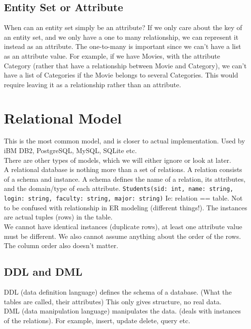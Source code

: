 \documentclass[12pt]{article}
\theoremstyle{definition}
\begin{document}
\subsection{Entity Set or Attribute}
When can an entity set simply be an attribute? If we only care about the key of an entity set, and we only have a one to many relationship, we can represent it instead as an attribute. The one-to-many is important since we can't have a list as an attribute value. For example, if we have Movies, with the attribute Category (rather that have a relationship between Movie and Category), we can't have a list of Categories if the Movie belongs to several Categories. This would require leaving it as a relationship rather than an attribute.
\\ \linebreak

\section{Relational Model}
This is the most common model, and is closer to actual implementation. Used by iBM DB2, PostgreSQL, MySQL, SQLite etc.
\\ \linebreak
There are other types of models, which we will either ignore or look at later. 
\\ \linebreak
A relational database is nothing more than a set of relations. A relation consists of a schema and instance. A schema defines the name of a relation, its attributes, and the domain/type of each attribute. \texttt{Students(sid: int, name: string, login: string, faculty: string, major: string)} Ie: relation == table. Not to be confused with relationship in ER modeling (different things!). The instances are actual tuples (rows) in the table. 
\\ \linebreak
We cannot have identical instances (duplicate rows), at least one attribute value must be different. We also cannot assume anything about the order of the rows. The column order also doesn't matter. 
\\ \linebreak
\subsection{DDL and DML}
DDL (data definition language) defines the schema of a database. (What the tables are called, their attributes) This only gives structure, no real data.
\\ \linebreak
DML (data manipulation language) manipulates the data. (deals with instances of the relations). For example, insert, update delete, query etc.
\\ \linebreak
\end{document}
